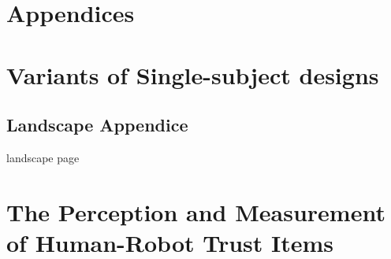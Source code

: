 \section*{Appendices}
\section{Variants of Single-subject designs}

\newpage
\begin{landscape}
	\section{Landscape Appendice}
	\label{app:Educational}	
	landscape page
\end{landscape}

\newpage
\section{The Perception and Measurement of Human-Robot Trust Items}
